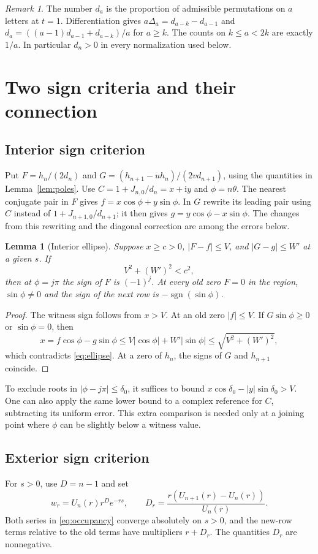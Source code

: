 \documentclass[11pt,reqno]{amsart}
\newtheorem{lemma}[theorem]{Lemma}
\theoremstyle{remark}
\newtheorem{remark}[theorem]{Remark}
\newcommand{\iu}{\mathrm{i}}
\begin{document}
\begin{remark}
The number $d_a$ is the proportion of admissible permutations on $a$ letters at $t=1$. Differentiation gives $a \Delta_a=d_{a-k}-d_{a-1}$ and $d_a=((a-1)d_{a-1}+d_{a-k})/a$ for $a\ge k$. The counts on $k\le a<2k$ are exactly $1/a$. In particular $d_n>0$ in every normalization used below.
\end{remark}

\section{Two sign criteria and their connection}\label{sec:sign}
\subsection{Interior sign criterion}
Put $F=h_n/(2d_n)$ and $G=(h_{n+1}-u h_n)/(2vd_{n+1})$, using the quantities in Lemma~\ref{lem:poles}. Use $C=1+J_{n,0}/d_n=x+\iu y$ and $\phi=n\theta$. The nearest conjugate pair in $F$ gives $f=x\cos\phi+y\sin\phi$. In $G$ rewrite its leading pair using $C$ instead of $1+J_{n+1,0}/d_{n+1}$; it then gives $g=y\cos\phi-x\sin\phi$. The changes from this rewriting and the diagonal correction are among the errors below.

\begin{lemma}[Interior ellipse]\label{lem:ellipse}
Suppose $x\ge c>0$, $|F-f|\le V$, and $|G-g|\le W'$ at a given $s$. If
\begin{equation}\label{eq:ellipse}
 V^2+(W')^2<c^2,
\end{equation}
then at $\phi=j\pi$ the sign of $F$ is $(-1)^j$. At every old zero $F=0$ in the region, $\sin\phi\ne0$ and the sign of the next row is $-\operatorname{sgn}(\sin\phi)$.
\end{lemma}
\begin{proof}
The witness sign follows from $x>V$. At an old zero $|f|\le V$. If $G\sin\phi\ge0$ or $\sin\phi=0$, then
\[
 x=f\cos\phi-g\sin\phi
 \le V|\cos\phi|+W'|\sin\phi|
 \le \sqrt{V^2+(W')^2},
\]
which contradicts \eqref{eq:ellipse}. At a zero of $h_n$, the signs of $G$ and $h_{n+1}$ coincide.
\end{proof}
To exclude roots in $|\phi-j\pi|\le\delta_0$, it suffices to bound $x\cos\delta_0-|y|\sin\delta_0>V$. One can also apply the same lower bound to a complex reference for $C$, subtracting its uniform error. This extra comparison is needed only at a joining point where $\phi$ can be slightly below a witness value.

\subsection{Exterior sign criterion}
For $s>0$, use $D=n-1$ and set
\[
 w_r=U_n(r)r^D e^{-rs},\qquad
 D_r=\frac{r(U_{n+1}(r)-U_n(r))}{U_n(r)} .
\]
Both series in \eqref{eq:occupancy} converge absolutely on $s>0$, and the new-row terms relative to the old terms have multipliers $r+D_r$. The quantities $D_r$ are nonnegative.
\end{document}

